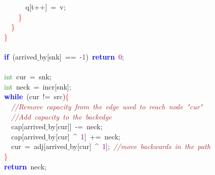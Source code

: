 {{\mbox{}\ \ \ \ \ \ \ \ q\textcolor{BrickRed}{[}t\textcolor{BrickRed}{++]}\ \textcolor{BrickRed}{=}\ v\textcolor{BrickRed}{;} \\
\mbox{}\ \ \ \ \ \ \textcolor{Red}{\}} \\
\mbox{}\ \ \ \ \textcolor{Red}{\}} \\
\mbox{}\ \ \textcolor{Red}{\}} \\
\mbox{} \\
\mbox{}\ \ \textbf{\textcolor{Blue}{if}}\ \textcolor{BrickRed}{(}arrived$\_$by\textcolor{BrickRed}{[}snk\textcolor{BrickRed}{]}\ \textcolor{BrickRed}{==}\ \textcolor{BrickRed}{-}\textcolor{Purple}{1}\textcolor{BrickRed}{)}\ \textbf{\textcolor{Blue}{return}}\ \textcolor{Purple}{0}\textcolor{BrickRed}{;} \\
\mbox{} \\
\mbox{}\ \ \textcolor{ForestGreen}{int}\ cur\ \textcolor{BrickRed}{=}\ snk\textcolor{BrickRed}{;} \\
\mbox{}\ \ \textcolor{ForestGreen}{int}\ neck\ \textcolor{BrickRed}{=}\ incr\textcolor{BrickRed}{[}snk\textcolor{BrickRed}{];} \\
\mbox{}\ \ \textbf{\textcolor{Blue}{while}}\ \textcolor{BrickRed}{(}cur\ \textcolor{BrickRed}{!=}\ src\textcolor{BrickRed}{)}\textcolor{Red}{\{} \\
\mbox{}\ \ \ \ \textit{\textcolor{Brown}{//Remove\ capacity\ from\ the\ edge\ used\ to\ reach\ node\ "{}cur"{}}} \\
\mbox{}\ \ \ \ \textit{\textcolor{Brown}{//Add\ capacity\ to\ the\ backedge}} \\
\mbox{}\ \ \ \ cap\textcolor{BrickRed}{[}arrived$\_$by\textcolor{BrickRed}{[}cur\textcolor{BrickRed}{]]}\ \textcolor{BrickRed}{-=}\ neck\textcolor{BrickRed}{;} \\
\mbox{}\ \ \ \ cap\textcolor{BrickRed}{[}arrived$\_$by\textcolor{BrickRed}{[}cur\textcolor{BrickRed}{]}\ \textcolor{BrickRed}{\textasciicircum{}}\ \textcolor{Purple}{1}\textcolor{BrickRed}{]}\ \textcolor{BrickRed}{+=}\ neck\textcolor{BrickRed}{;} \\
\mbox{}\ \ \ \ cur\ \textcolor{BrickRed}{=}\ adj\textcolor{BrickRed}{[}arrived$\_$by\textcolor{BrickRed}{[}cur\textcolor{BrickRed}{]}\ \textcolor{BrickRed}{\textasciicircum{}}\ \textcolor{Purple}{1}\textcolor{BrickRed}{];}\ \textit{\textcolor{Brown}{//move\ backwards\ in\ the\ path}} \\
\mbox{}\ \ \textcolor{Red}{\}} \\
\mbox{}\ \ \textbf{\textcolor{Blue}{return}}\ neck\textcolor{BrickRed}{;} \\
}}
